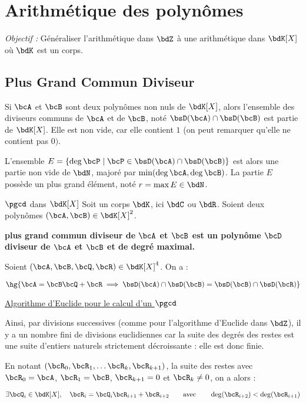 \documentclass[a4paper,french,bookmarks]{article}
\begin{document}

\initcours

\setcounter{section}{4}
\section{Arithmétique des polynômes}

\textit{Objectif :} Généraliser l'arithmétique dans $\bdZ$ à une arithmétique dans $\bdK[X]$ où $\bdK$ est un corps.

\subsection{Plus Grand Commun Diviseur}

Si $\bcA$ et $\bcB$ sont deux polynômes non nuls de $\bdK[X]$, alors l'ensemble des diviseurs communs de $\bcA$ et de $\bcB$, noté $\bsD(\bcA) \cap \bsD(\bcB)$ est partie de $\bdK[X]$. Elle est non vide, car elle contient $1$ (on peut remarquer qu'elle ne contient pas $0)$.

L'ensemble $E = \{ \deg \bcP \mid \bcP \in \bsD(\bcA) \cap \bsD(\bcB) \}$ est alors une partie non vide de $\bdN$, majoré par $\min(\deg \bcA, \deg \bcB)$. La partie $E$ possède un plus grand élément, noté $r = \max E \in \bdN$.

\begin{definition}{$\pgcd$ dans $\bdK[X]$}{}
    Soit un corps $\bdK$, ici $\bdC$ ou $\bdR$. Soient deux polynômes $(\bcA, \bcB) \in \bdK[X]^2$. 
    
     \bf{plus grand commun diviseur de $\bcA$ et $\bcB$} est un polynôme $\bcD$ diviseur de $\bcA$ et $\bcB$ et de degré maximal.
\end{definition}

\begin{lemma}{}{}
    Soient $(\bcA, \bcB, \bcQ, \bcR) \in \bdK[X]^4$. On a :
    
    \[\hg{\bcA = \bcB\bcQ + \bcR \implies \bsD(\bcA) \cap \bsD(\bcB) = \bsD(\bcB) \cap \bsD(\bcR)}\]
\end{lemma}

\begin{center}
    \underline{Algorithme d'Euclide pour le calcul d'un $\pgcd$}
\end{center}

Ainsi, par divisions successives (comme pour l'algorithme d'Euclide dans $\bdZ$), il y a un nombre fini de divisions euclidiennes car la suite des degrés des restes est une suite d'entiers naturels strictement décroissante : elle est donc finie.

En notant $(\bcR_0, \bcR_1, \dots \bcR_k, \bcR_{k+1})$, la suite des restes avec $\bcR_0 = \bcA$, $\bcR_1 = \bcB$, $\bcR_{k+1} = 0$ et $\bcR_k \neq 0$, on a alors :

\[ \exists \bcQ_i \in \bdK[X], \quad \bcR_i = \bcQ_i\bcR_{i+1} + \bcR_{i+2} \qquad\text{avec}\qquad \deg(\bcR_{i+2}) < \deg(\bcR_{i+1})\]
\end{document}
